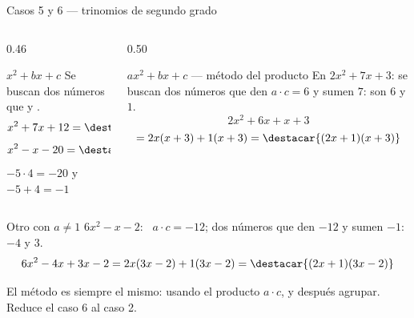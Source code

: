 \documentclass[aspectratio=169,10pt]{beamer}
\begin{document}
\begin{frame}{Casos 5 y 6 — trinomios de segundo grado}
  \scriptsize
  \begin{columns}[T,onlytextwidth]
    \begin{column}{0.46\textwidth}
      \begin{block}{$x^{2}+bx+c$}
        \tiny
        Se buscan dos números que  y
        .
        \[ x^{2}+7x+12 = \destacar{(x+3)(x+4)} \]
        \[ x^{2}-x-20 = \destacar{(x-5)(x+4)} \]
        {\color{uniGris} $-5\cdot 4 = -20$ y $-5+4 = -1$ \checkmark}
      \end{block}
    \end{column}
    \begin{column}{0.50\textwidth}
      \begin{block}{$ax^{2}+bx+c$ — método del producto}
        \tiny
        En $2x^{2}+7x+3$: se buscan dos números que den
        $a\cdot c = 6$ y sumen $7$: son $6$ y $1$.
        \[ 2x^{2}+6x+x+3 \]
        \[ = 2x(x+3) + 1(x+3) = \destacar{(2x+1)(x+3)} \]
      \end{block}
    \end{column}
  \end{columns}

  \vspace{0.1cm}
  \begin{exampleblock}{Otro con $a\neq 1$}
    \scriptsize
    $6x^{2}-x-2$: \ $a\cdot c = -12$; dos números que den $-12$ y sumen $-1$:
    $-4$ y $3$.
    \[ 6x^{2}-4x+3x-2 = 2x(3x-2)+1(3x-2) = \destacar{(2x+1)(3x-2)} \]
  \end{exampleblock}

  \vspace{0.05cm}
  {\tiny\color{uniGris} El método es siempre el mismo:  usando el producto $a\cdot c$, y después agrupar. Reduce
  el caso 6 al caso 2.}
\end{frame}
\end{document}
